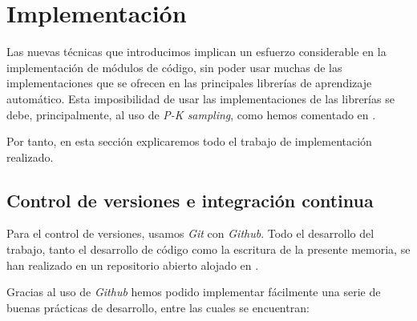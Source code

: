 \chapter{Implementación} \label{ich:implementacion}

Las nuevas técnicas que introducimos implican un esfuerzo considerable en la implementación de módulos de código, sin poder usar muchas de las implementaciones que se ofrecen en las principales librerías de aprendizaje automático. Esta imposibilidad de usar las implementaciones de las librerías se debe, principalmente, al uso de \textit{P-K sampling}, como hemos comentado en .

Por tanto, en esta sección explicaremos todo el trabajo de implementación realizado.

\section{Control de versiones e integración continua}

Para el control de versiones, usamos \textit{Git} con \textit{Github}. Todo el desarrollo del trabajo, tanto el desarrollo de código como la escritura de la presente memoria, se han realizado en un repositorio abierto alojado en \cite{informatica:repogithub}.

Gracias al uso de \textit{Github} hemos podido implementar fácilmente una serie de buenas prácticas de desarrollo, entre las cuales se encuentran:

